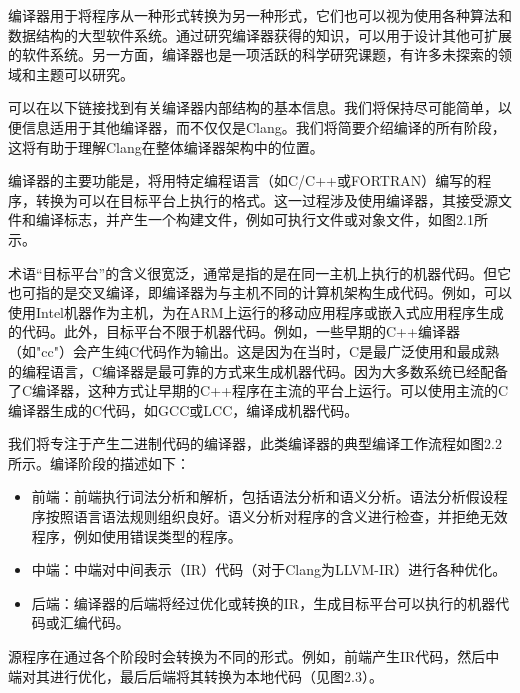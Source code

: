 编译器用于将程序从一种形式转换为另一种形式，它们也可以视为使用各种算法和数据结构的大型软件系统。通过研究编译器获得的知识，可以用于设计其他可扩展的软件系统。另一方面，编译器也是一项活跃的科学研究课题，有许多未探索的领域和主题可以研究。

可以在以下链接找到有关编译器内部结构的基本信息。我们将保持尽可能简单，以便信息适用于其他编译器，而不仅仅是Clang。我们将简要介绍编译的所有阶段，这将有助于理解Clang在整体编译器架构中的位置。


编译器的主要功能是，将用特定编程语言（如C/C++或FORTRAN）编写的程序，转换为可以在目标平台上执行的格式。这一过程涉及使用编译器，其接受源文件和编译标志，并产生一个构建文件，例如可执行文件或对象文件，如图2.1所示。


术语“目标平台”的含义很宽泛，通常是指的是在同一主机上执行的机器代码。但它也可指的是交叉编译，即编译器为与主机不同的计算机架构生成代码。例如，可以使用Intel机器作为主机，为在ARM上运行的移动应用程序或嵌入式应用程序生成的代码。此外，目标平台不限于机器代码。例如，一些早期的C++编译器（如"cc"）会产生纯C代码作为输出。这是因为在当时，C是最广泛使用和最成熟的编程语言，C编译器是最可靠的方式来生成机器代码。因为大多数系统已经配备了C编译器，这种方式让早期的C++程序在主流的平台上运行。可以使用主流的C编译器生成的C代码，如GCC或LCC，编译成机器代码。


我们将专注于产生二进制代码的编译器，此类编译器的典型编译工作流程如图2.2所示。编译阶段的描述如下：

\begin{itemize}
\item
前端：前端执行词法分析和解析，包括语法分析和语义分析。语法分析假设程序按照语言语法规则组织良好。语义分析对程序的含义进行检查，并拒绝无效程序，例如使用错误类型的程序。

\item
中端：中端对中间表示（IR）代码（对于Clang为LLVM-IR）进行各种优化。

\item
后端：编译器的后端将经过优化或转换的IR，生成目标平台可以执行的机器代码或汇编代码。
\end{itemize}

源程序在通过各个阶段时会转换为不同的形式。例如，前端产生IR代码，然后中端对其进行优化，最后后端将其转换为本地代码（见图2.3）。

